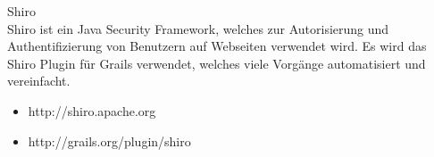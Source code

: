 Shiro\\
Shiro ist ein Java Security Framework, welches zur Autorisierung und Authentifizierung von Benutzern auf Webseiten verwendet wird. Es wird das Shiro Plugin für Grails verwendet, welches viele Vorgänge automatisiert und vereinfacht.\\
\begin{itemize}
\item http://shiro.apache.org\\
\item http://grails.org/plugin/shiro\\
\end{itemize}\\

